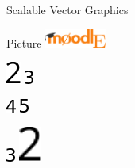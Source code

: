 \documentclass{article}
\begin{document}
\begin{quiz}{Scalable Vector Graphics}
\begin{matching}[dd]{Picture}
\includegraphics[width=2cm]{MoodlE_logo.SVG}
\item \includegraphics{2 2} \answer \includegraphics{3}
\item \includegraphics{4} \answer \includegraphics{5}
\item \includegraphics{3} \answer \includegraphics[width=2em]{2 2}
\end{matching}

\end{quiz}
\end{document}
